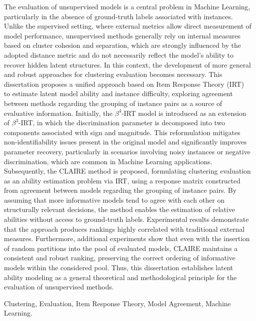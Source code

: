 \documentclass{ufpethesis}
\begin{document}
\abstract

The evaluation of unsupervised models is a central problem in Machine Learning, particularly in the absence of ground-truth labels associated with instances. Unlike the supervised setting, where external metrics allow direct measurement of model performance, unsupervised methods generally rely on internal measures based on cluster cohesion and separation, which are strongly influenced by the adopted distance metric and do not necessarily reflect the model’s ability to recover hidden latent structures. In this context, the development of more general and robust approaches for clustering evaluation becomes necessary. This dissertation proposes a unified approach based on Item Response Theory (IRT) to estimate latent model ability and instance difficulty, exploring agreement between methods regarding the grouping of instance pairs as a source of evaluative information. Initially, the $\beta^4$-IRT model is introduced as an extension of $\beta^3$-IRT, in which the discrimination parameter is decomposed into two components associated with sign and magnitude. This reformulation mitigates non-identifiability issues present in the original model and significantly improves parameter recovery, particularly in scenarios involving noisy instances or negative discrimination, which are common in Machine Learning applications. Subsequently, the CLAIRE method is proposed, formulating clustering evaluation as an ability estimation problem via IRT, using a response matrix constructed from agreement between models regarding the grouping of instance pairs. By assuming that more informative models tend to agree with each other on structurally relevant decisions, the method enables the estimation of relative abilities without access to ground-truth labels. Experimental results demonstrate that the approach produces rankings highly correlated with traditional external measures. Furthermore, additional experiments show that even with the insertion of random partitions into the pool of evaluated models, CLAIRE maintains a consistent and robust ranking, preserving the correct ordering of informative models within the considered pool. Thus, this dissertation establishes latent ability modeling as a general theoretical and methodological principle for the evaluation of unsupervised methods.
\begin{keywords}
Clustering, Evaluation, Item Response Theory, Model Agreement, Machine Learning.
\end{keywords}
\end{document}
